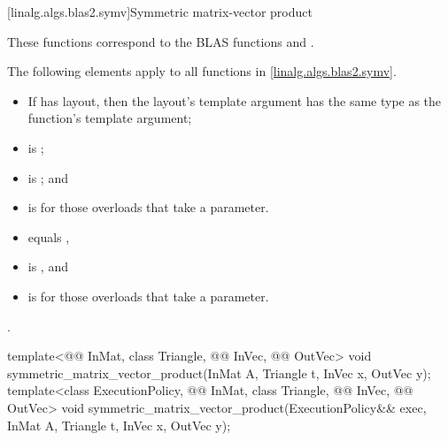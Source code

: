 [linalg.algs.blas2.symv]{Symmetric matrix-vector product}

\pnum
\begin{note}
These functions correspond to the BLAS functions
 and \supercite{blas2}.
\end{note}

\pnum
The following elements apply to all functions in \ref{linalg.algs.blas2.symv}.

\pnum
\mandates
\begin{itemize}
\item
If  has  layout,
then the layout's  template argument has
the same type as the function's  template argument;
\item
{} is ;
\item
{}
is ; and
\item
{}
is  for those overloads that take a  parameter.
\end{itemize}

\pnum
\expects
\begin{itemize}
\item
{} equals ,
\item
{} is , and
\item
{} is 
for those overloads that take a  parameter.
\end{itemize}

\pnum
\complexity
{}.

%
\begin{itemdecl}
template<@@ InMat, class Triangle, @@ InVec, @@ OutVec>
  void symmetric_matrix_vector_product(InMat A, Triangle t, InVec x, OutVec y);
template<class ExecutionPolicy,
         @@ InMat, class Triangle, @@ InVec, @@ OutVec>
  void symmetric_matrix_vector_product(ExecutionPolicy&& exec,
                                       InMat A, Triangle t, InVec x, OutVec y);
\end{itemdecl}

